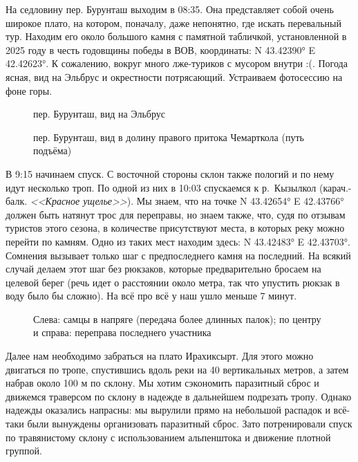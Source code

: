 На седловину пер. Бурунташ выходим в 08:35. Она представляет собой очень широкое плато, на котором, поначалу, даже непонятно, где искать перевальный тур. Находим его около большого камня с памятной табличкой, установленной в 2025 году в честь годовщины победы в ВОВ, координаты: N 43.42390° E 42.42623°. К сожалению, вокруг много лже-туриков с мусором внутри :(. Погода ясная, вид на Эльбрус и окрестности потрясающий. Устраиваем фотосессию на фоне горы.

\begin{figure}[h!]
	\centering
	\caption{пер. Бурунташ, вид на Эльбрус}
	\label{fig:buruntash1}
\end{figure}

\begin{figure}[h!]
	\centering
	\caption{пер. Бурунташ, вид в долину правого притока Чемарткола (путь подъёма)}
	\label{fig:buruntash2}
\end{figure}

В 9:15 начинаем спуск. С восточной стороны склон также пологий и по нему идут несколько троп. По одной из них в 10:03  спускаемся к р.~Кызылкол (карач.-балк. \textit{<<Красное ущелье>>}). Мы знаем, что на точке N 43.42654° E 42.43766° должен быть натянут трос для переправы, но знаем также, что, судя по отзывам туристов этого сезона, в количестве присутствуют места, в которых реку можно перейти по камням. Одно из таких мест находим здесь: N 43.42483° E 42.43703°. Сомнения вызывает только шаг с предпоследнего камня на последний. На всякий случай делаем этот шаг без рюкзаков, которые предварительно бросаем на целевой берег (речь идет о расстоянии около метра, так что упустить рюкзак в воду было бы сложно). На всё про всё у наш ушло меньше 7 минут.

\begin{figure}[h!]
	\centering
	\caption{Слева: самцы в напряге (передача более длинных палок); по центру и справа: переправа последнего участника}
	\label{fig:pereprava}
\end{figure}

Далее нам необходимо забраться на плато Ирахиксырт. Для этого можно двигаться по тропе, спустившись вдоль реки на 40 вертикальных метров, а затем набрав около 100 м по склону. Мы хотим сэкономить паразитный сброс и движемся траверсом по склону в надежде в дальнейшем подрезать тропу. Однако надежды оказались напрасны: мы вырулили прямо на небольшой распадок и всё-таки были вынуждены организовать паразитный сброс. Зато потренировали спуск по травянистому склону с использованием альпенштока и движение плотной группой.

